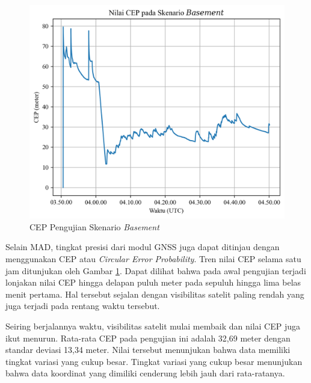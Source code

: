 \begin{figure}[H]
	\centering
	\includegraphics[width=13cm]{contents/chapter-4/1-skenario-basement/cep.png}
	\caption{CEP Pengujian Skenario \textit{Basement}}
	\label{Fig: basement-cep}
\end{figure}

Selain MAD, tingkat presisi dari modul GNSS juga dapat ditinjau dengan menggunakan CEP atau \textit{Circular Error Probability}. Tren nilai CEP selama satu jam ditunjukan oleh Gambar \ref{Fig: basement-cep}. Dapat dilihat bahwa pada awal pengujian terjadi lonjakan nilai CEP hingga delapan puluh meter pada sepuluh hingga lima belas menit pertama. Hal tersebut sejalan dengan visibilitas satelit paling rendah yang juga terjadi pada rentang waktu tersebut. 

Seiring berjalannya waktu, visibilitas satelit mulai membaik dan nilai CEP juga ikut menurun. Rata-rata CEP pada pengujian ini adalah 32,69 meter dengan standar deviasi 13,34 meter. Nilai tersebut menunjukan bahwa data memiliki tingkat variasi yang cukup besar. Tingkat variasi yang cukup besar menunjukan bahwa data koordinat yang dimiliki cenderung lebih jauh dari rata-ratanya.

